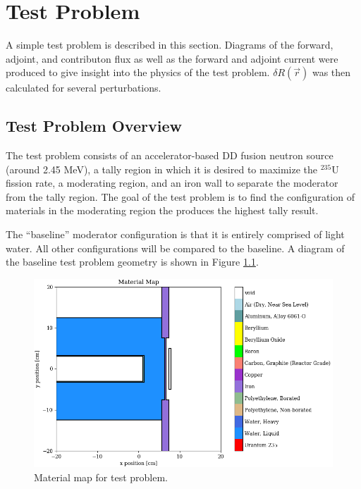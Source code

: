 \chapter{Test Problem}
\label{chap:testprob}

A simple test problem is described in this section.
Diagrams of the forward, adjoint, and contributon flux as well as the forward and adjoint current were produced to give insight into the physics of the test problem.
$\delta R\left(\vec{r}\right)$ was then calculated for several perturbations.


\section{Test Problem Overview}
\label{sec:bg:tp:overview}

The test problem consists of an accelerator-based DD fusion neutron source (around 2.45 MeV), a tally region in which it is desired to maximize the ${}^{235}\text{U}$ fission rate, a moderating region, and an iron wall to separate the moderator from the tally region.
The goal of the test problem is to find the configuration of materials in the moderating region the produces the highest tally result.

The ``baseline'' moderator configuration is that it is entirely comprised of light water.
All other configurations will be compared to the baseline.
A diagram of the baseline test problem geometry is shown in Figure \ref{fig:tp:material_map}.

\begin{figure}[h!]
  \centering
  \includegraphics[width=\linewidth]{content/testprob/material_map.png}
  \caption{Material map for test problem.}
  \label{fig:tp:material_map}
\end{figure}

